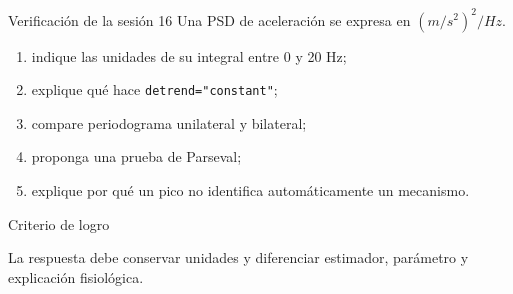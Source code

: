 \documentclass[
  10pt,
  ignorenonframetext,
  aspectratio=169,
  spanish,
]{beamer}
\providecommand{\tightlist}{%
  \setlength{\itemsep}{0pt}\setlength{\parskip}{0pt}}
\begin{document}
\begin{frame}[fragile]{Verificación de la sesión 16}
\label{d2-097}
Una PSD de aceleración se expresa en \((m/s^2)^2/Hz\).

\begin{enumerate}
\tightlist
\item
  indique las unidades de su integral entre 0 y 20 Hz;
\item
  explique qué hace \texttt{detrend="constant"};
\item
  compare periodograma unilateral y bilateral;
\item
  proponga una prueba de Parseval;
\item
  explique por qué un pico no identifica automáticamente un mecanismo.
\end{enumerate}

\begin{block}{Criterio de logro}

La respuesta debe conservar unidades y diferenciar estimador, parámetro
y explicación fisiológica.

\end{block}

\end{frame}
\end{document}
